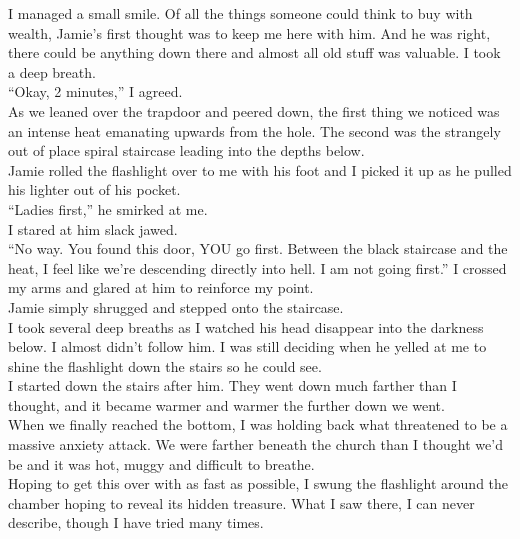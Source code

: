 \documentclass[a5paper]{scrartcl}
\begin{document}
I managed a small smile. Of all the things someone could think to buy with wealth, Jamie's first thought was to keep me here with him. And he was right, there could be anything down there and almost all old stuff was valuable. I took a deep breath.\\


\enquote{Okay, 2 minutes,} I agreed.\\


As we leaned over the trapdoor and peered down, the first thing we noticed was an intense heat emanating upwards from the hole. The second was the strangely out of place spiral staircase leading into the depths below. \\


Jamie rolled the flashlight over to me with his foot and I picked it up as he pulled his lighter out of his pocket.\\


\enquote{Ladies first,} he smirked at me.\\


I stared at him slack jawed. \\


\enquote{No way. You found this door, YOU go first. Between the black staircase and the heat, I feel like we're descending directly into hell. I am not going first.} I crossed my arms and glared at him to reinforce my point. \\


Jamie simply shrugged and stepped onto the staircase. \\


I took several deep breaths as I watched his head disappear into the darkness below. I almost didn't follow him. I was still deciding when he yelled at me to shine the flashlight down the stairs so he could see. \\


I started down the stairs after him. They went down much farther than I thought, and it became warmer and warmer the further down we went. \\


When we finally reached the bottom, I was holding back what threatened to be a massive anxiety attack. We were farther beneath the church than I thought we'd be and it was hot, muggy and difficult to breathe. \\


Hoping to get this over with as fast as possible, I swung the flashlight around the chamber hoping to reveal its hidden treasure. What I saw there, I can never describe, though I have tried many times. \\
\end{document}
